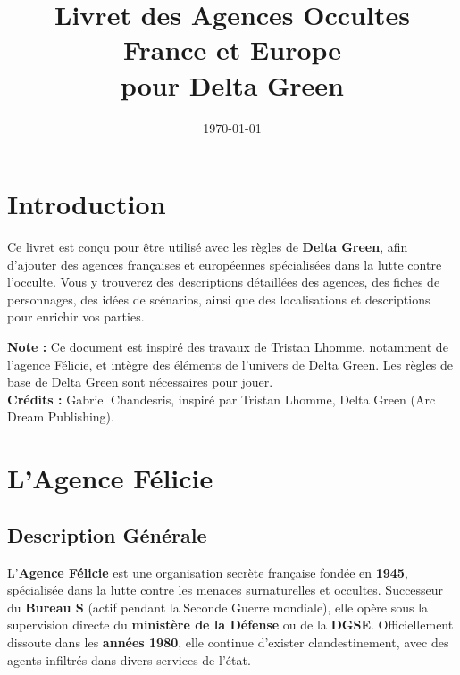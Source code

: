 \documentclass[10pt,a5paper,twoside]{book}
\title{\textbf{Livret des Agences Occultes \\ France et Europe \\ pour Delta Green}}
\author{}
\date{\today}
\begin{document}
\maketitle

\newpage

\tableofcontents

\newpage

\chapter*{Introduction}

Ce livret est conçu pour être utilisé avec les règles de \textbf{Delta Green}, afin d'ajouter des agences françaises et européennes spécialisées dans la lutte contre l'occulte. Vous y trouverez des descriptions détaillées des agences, des fiches de personnages, des idées de scénarios, ainsi que des localisations et descriptions pour enrichir vos parties.

\begin{shaded}
	\begin{center}
		\textbf{Note :} Ce document est inspiré des travaux de Tristan Lhomme, notamment de l'agence Félicie, et intègre des éléments de l'univers de Delta Green. Les règles de base de Delta Green sont nécessaires pour jouer. \\ \textbf{Crédits :} Gabriel Chandesris, inspiré par Tristan Lhomme, Delta Green (Arc Dream Publishing).
	\end{center}
\end{shaded}

\newpage

\chapter{L'Agence Félicie}

\section{Description Générale}

L'\textbf{Agence Félicie} est une organisation secrète française fondée en \textbf{1945}, spécialisée dans la lutte contre les menaces surnaturelles et occultes. Successeur du \textbf{Bureau S} (actif pendant la Seconde Guerre mondiale), elle opère sous la supervision directe du \textbf{ministère de la Défense} ou de la \textbf{DGSE}. Officiellement dissoute dans les \textbf{années 1980}, elle continue d'exister clandestinement, avec des agents infiltrés dans divers services de l'état.
\end{document}
